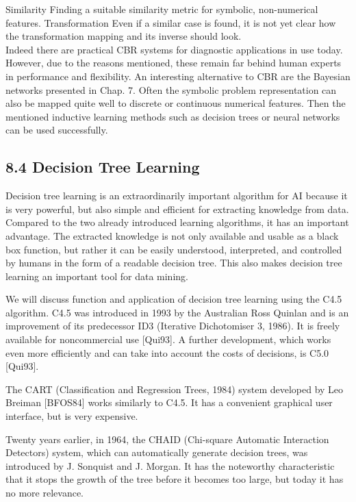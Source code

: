 \documentclass[10pt]{book}
\begin{document}
\begin{center}
\begin{enumerate}
\begin{center}
Similarity Finding a suitable similarity metric for symbolic, non-numerical features. Transformation Even if a similar case is found, it is not yet clear how the transformation mapping and its inverse should look.\\
Indeed there are practical CBR systems for diagnostic applications in use today. However, due to the reasons mentioned, these remain far behind human experts in performance and flexibility. An interesting alternative to CBR are the Bayesian networks presented in Chap. 7. Often the symbolic problem representation can also be mapped quite well to discrete or continuous numerical features. Then the mentioned inductive learning methods such as decision trees or neural networks can be used successfully.

\subsection*{8.4 Decision Tree Learning}
Decision tree learning is an extraordinarily important algorithm for AI because it is very powerful, but also simple and efficient for extracting knowledge from data. Compared to the two already introduced learning algorithms, it has an important advantage. The extracted knowledge is not only available and usable as a black box function, but rather it can be easily understood, interpreted, and controlled by humans in the form of a readable decision tree. This also makes decision tree learning an important tool for data mining.

We will discuss function and application of decision tree learning using the C4.5 algorithm. C4.5 was introduced in 1993 by the Australian Ross Quinlan and is an improvement of its predecessor ID3 (Iterative Dichotomiser 3, 1986). It is freely available for noncommercial use [Qui93]. A further development, which works even more efficiently and can take into account the costs of decisions, is C5.0 [Qui93].

The CART (Classification and Regression Trees, 1984) system developed by Leo Breiman [BFOS84] works similarly to C4.5. It has a convenient graphical user interface, but is very expensive.

Twenty years earlier, in 1964, the CHAID (Chi-square Automatic Interaction Detectors) system, which can automatically generate decision trees, was introduced by J. Sonquist and J. Morgan. It has the noteworthy characteristic that it stops the growth of the tree before it becomes too large, but today it has no more relevance.


\end{center}
\end{enumerate}
\end{center}
\end{document}
